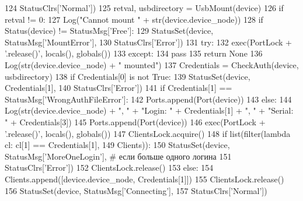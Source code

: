 \begin{DoxyCode}
124                   StatusClrs[\textcolor{stringliteral}{'Normal'}])
125         retval, usbdirectory = UsbMount(device)
126         \textcolor{keywordflow}{if} retval != 0:
127             Log(\textcolor{stringliteral}{"Cannot mount "} + str(device.device\_node))
128             \textcolor{keywordflow}{if} Status(device) != StatusMsg[\textcolor{stringliteral}{'Free'}]:
129                 StatusSet(device, StatusMsg[\textcolor{stringliteral}{'MountError'}],
130                           StatusClrs[\textcolor{stringliteral}{'Error'}])
131                 \textcolor{keywordflow}{try}:
132                     exec(PortLock + \textcolor{stringliteral}{'.release()'}, locals(), globals())
133                 \textcolor{keywordflow}{except}:
134                     \textcolor{keywordflow}{pass}
135             \textcolor{keywordflow}{return} \textcolor{keywordtype}{None}
136         Log(str(device.device\_node) + \textcolor{stringliteral}{" mounted"})
137         Credentials = CheckAuth(device, usbdirectory)
138         \textcolor{keywordflow}{if} Credentials[0] \textcolor{keywordflow}{is} \textcolor{keywordflow}{not} \textcolor{keyword}{True}:
139             StatusSet(device, Credentials[1],
140                       StatusClrs[\textcolor{stringliteral}{'Error'}])
141             \textcolor{keywordflow}{if} Credentials[1] == StatusMsg[\textcolor{stringliteral}{'WrongAuthFileError'}]:
142                 Ports.append(Port(device))
143         \textcolor{keywordflow}{else}:
144             Log(str(device.device\_node) + \textcolor{stringliteral}{", "} + \textcolor{stringliteral}{"Login: "} + Credentials[1] + \textcolor{stringliteral}{", "} + \textcolor{stringliteral}{"Serial: "} + 
      Credentials[3])
145             Ports.append(Port(device))
146             exec(PortLock + \textcolor{stringliteral}{'.release()'}, locals(), globals())
147             ClientsLock.acquire()
148             \textcolor{keywordflow}{if} list(filter(\textcolor{keyword}{lambda} cl: cl[1] == Credentials[1],
149                            Clients)):
150                 StatusSet(device, StatusMsg[\textcolor{stringliteral}{'MoreOneLogin'}], \textcolor{comment}{# если больше одного логина}
151                           StatusClrs[\textcolor{stringliteral}{'Error'}])
152                 ClientsLock.release()
153             \textcolor{keywordflow}{else}:
154                 Clients.append([device.device\_node, Credentials[1]])
155                 ClientsLock.release()
156                 StatusSet(device, StatusMsg[\textcolor{stringliteral}{'Connecting'}],
157                           StatusClrs[\textcolor{stringliteral}{'Normal'}])

\end{DoxyCode}
